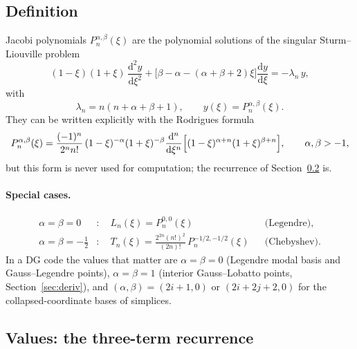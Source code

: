 \documentclass[11pt,a4paper]{article}
\newcommand{\Jac}[3]{P_{#1}^{#2,#3}}            %
\newcommand{\Pab}[1]{P_{#1}^{\alpha,\beta}}     %
\newcommand{\dd}{\mathrm{d}}
\begin{document}
\subsection{Definition}

Jacobi polynomials $\Pab{n}(\xi)$ are the polynomial solutions of the singular
Sturm--Liouville problem~\cite[App.~A.1]{KS2005}
\begin{equation}
  (1-\xi)(1+\xi)\,\frac{\dd^2 y}{\dd\xi^2}
  + \bigl[\beta-\alpha-(\alpha+\beta+2)\xi\bigr]\frac{\dd y}{\dd\xi}
  = -\lambda_n\, y,
  \tag{A.1.1}
\end{equation}
with
\begin{equation*}
  \lambda_n = n(n+\alpha+\beta+1),
  \qquad y(\xi) = \Pab{n}(\xi).
\end{equation*}
They can be written explicitly with the Rodrigues formula
\begin{equation*}
  \Pab{n}(\xi) = \frac{(-1)^n}{2^n n!}\,(1-\xi)^{-\alpha}(1+\xi)^{-\beta}
  \frac{\dd^n}{\dd\xi^n}\Bigl[(1-\xi)^{\alpha+n}(1+\xi)^{\beta+n}\Bigr],
  \qquad \alpha,\beta>-1,
\end{equation*}
but this form is never used for computation; the recurrence of
Section~\ref{sec:values} is.

\paragraph{Special cases.}
\begin{align*}
  \alpha=\beta=0 &: \quad L_n(\xi) = \Jac{n}{0}{0}(\xi)
     && \text{(Legendre)},\\
  \alpha=\beta=-\tfrac12 &: \quad T_n(\xi) = \frac{2^{2n}(n!)^2}{(2n)!}\,
     \Jac{n}{-1/2}{-1/2}(\xi) && \text{(Chebyshev)}.
\end{align*}
In a DG code the values that matter are $\alpha=\beta=0$ (Legendre modal basis
and Gauss--Legendre points), $\alpha=\beta=1$ (interior Gauss--Lobatto points,
Section~\ref{sec:deriv}), and $(\alpha,\beta)=(2i+1,0)$ or $(2i+2j+2,0)$ for
the collapsed-coordinate bases of simplices.

\subsection{Values: the three-term recurrence}
\label{sec:values}
\end{document}
